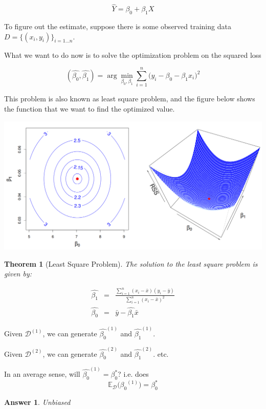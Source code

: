 \documentclass{article}
\theoremstyle{MyNonumberplain}
\theoremstyle{break}
\newcommand{\ev}{\mathbb{E}}
\newcommand{\evd}{\ev_{\mathcal{D}}}
\newcommand{\bt}[1]{\beta_{#1}}
\newcommand\ddfrac[2]{\frac{\displaystyle #1}{\displaystyle #2}}
\theoremstyle{break}
\newtheorem{theorem}{Theorem}[section]
\newtheorem*{answer}{Answer}
\theoremstyle{break}
\theoremstyle{break}
\begin{document}
$$\hat{Y}=\bt{0}+\bt{1}X$$

To figure out the estimate, suppose there is some observed training data $D=\biggl\{(x_i,y_i)\biggr\}_{i=1...n}$.

What we want to do now is to solve the optimization problem on the squared loss

$$(\hat{\bt{0}},\hat{\bt{1}})=\arg\min_{\bt{0},\bt{1}}\sum_{i=1}^n\bigl(y_i-\bt{0}-\bt{1}x_i\bigr)^2$$

This problem is also known as least square problem, and the figure below shows the function that we want to find the optimized value.

\begin{center}
    \includegraphics*[scale=0.25]{img7.png}
\end{center}

\begin{thmbox}
    \begin{theorem}[Least Square Problem]
        The solution to the least square problem is given by: 
    \end{theorem}
        \begin{eqnarray*}
            \hat{\bt{1}}&=& \ddfrac{\sum_{i=1}^n(x_i-\bar{x})(y_i-\bar{y})}{\sum_{i=1}^n(x_i-\bar{x})^2}\\
            \hat{\bt{0}}&=& \bar{y}- \hat{\bt{1}}\bar{x}
        \end{eqnarray*}
\end{thmbox}

\begin{prfbox}
    \begin{question*}
        Given $\mathcal{D}^{(1)}$, we can generate $\hat{\bt{0}}^{(1)}$ and $\hat{\bt{1}}^{(1)}$.

        Given $\mathcal{D}^{(2)}$, we can generate $\hat{\bt{0}}^{(2)}$ and $\hat{\bt{1}}^{(2)}$.
        etc.

        In an average sense, will $\hat{\bt{0}}^{(1)}=\bt{0}^*$? i.e. does $$\evd\bigl({\bt{0}}^{(1)}\bigr)=\bt{0}^*$$

        \begin{answer}
            Unbiased
        \end{answer}
    \end{question*}

\end{prfbox}
\end{document}
